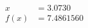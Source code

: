 \documentclass[preview]{standalone}
\begin{document}
\begin{align*}
x &= 3.0730\\f(x) &= 7.4861560
\end{align*}
\end{document}
